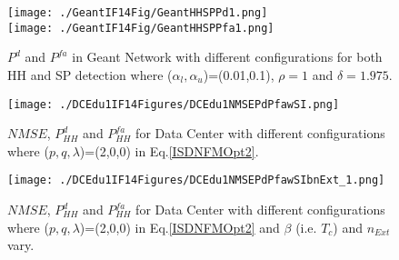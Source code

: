 \begin{figure}
  \begin{center}
    {\texttt{[image: ./GeantIF14Fig/GeantHHSPPd1.png]}} \\ \vspace{1.25cm}
    {\texttt{[image: ./GeantIF14Fig/GeantHHSPPfa1.png]}}
  \end{center}
  \caption{{\footnotesize{$P^{d}$ and $P^{fa}$ in Geant Network with different configurations for both HH and SP detection where ($\alpha_{l},\alpha_{u}$)=(0.01,0.1), $\rho=1$ and $\delta=1.975$.}}}
  \label{fig:GeantPdfaHHSPwSI1}
\end{figure}
\begin{figure}
  \begin{center}
    {\texttt{[image: ./DCEdu1IF14Figures/DCEdu1NMSEPdPfawSI.png]}} \\
  \end{center}
  \caption{{\footnotesize{$NMSE$, $P_{HH}^{d}$ and $P_{HH}^{fa}$ for Data Center with different configurations where ($p,q,\lambda$)=(2,0,0) in Eq.\ref{ISDNFMOpt2}.}}}
  \label{fig:DCEdu1NMSEPdfawSI}
\end{figure}
\begin{figure}
  \begin{center}
    {\texttt{[image: ./DCEdu1IF14Figures/DCEdu1NMSEPdPfawSIbnExt\_1.png]}}
  \end{center}
  \caption{{\footnotesize{$NMSE$, $P_{HH}^{d}$ and $P_{HH}^{fa}$ for Data Center with different configurations where ($p,q,\lambda$)=(2,0,0) in Eq.\ref{ISDNFMOpt2} and $\beta$ (i.e. $T_{c}$) and $n_{Ext}$ vary.}}}
  \label{fig:Edu1DCbetanExt}
\end{figure}

